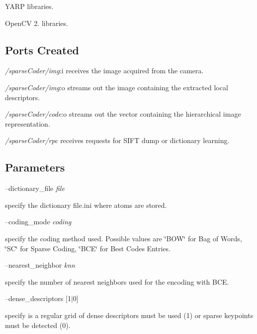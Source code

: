 \begin{DoxyItemize}
\item Y\+A\+RP libraries.
\item Open\+CV 2. libraries.
\end{DoxyItemize}\hypertarget{group__icub__sparseCoder_portsc_sec}{}\subsection{Ports Created}\label{group__icub__sparseCoder_portsc_sec}

\begin{DoxyItemize}
\item {\itshape /sparse\+Coder/img}\+:i receives the image acquired from the camera.
\item {\itshape /sparse\+Coder/img}\+:o streams out the image containing the extracted local descriptors.
\item {\itshape /sparse\+Coder/code}\+:o streams out the vector containing the hierarchical image representation.
\item {\itshape /sparse\+Coder/rpc} receives requests for S\+I\+FT dump or dictionary learning.
\end{DoxyItemize}\hypertarget{group__caffeCoder_parameters_sec}{}\subsection{Parameters}\label{group__caffeCoder_parameters_sec}
--dictionary\+\_\+file {\itshape file} 
\begin{DoxyItemize}
\item specify the dictionary file.\+ini where atoms are stored.
\end{DoxyItemize}

--coding\+\_\+mode {\itshape coding} 
\begin{DoxyItemize}
\item specify the coding method used. Possible values are \char`\"{}\+B\+O\+W\char`\"{} for Bag of Words, \char`\"{}\+S\+C\char`\"{} for Sparse Coding, \char`\"{}\+B\+C\+E\char`\"{} for Best Codes Entries.
\end{DoxyItemize}

--nearest\+\_\+neighbor {\itshape knn} 
\begin{DoxyItemize}
\item specify the number of nearest neighbors used for the encoding with B\+CE.
\end{DoxyItemize}

--dense\+\_\+descriptors {\itshape }\mbox{[}1$\vert$0\mbox{]}
\begin{DoxyItemize}
\item specify is a regular grid of dense descriptors must be used (1) or sparse keypoints must be detected (0).
\end{DoxyItemize}

